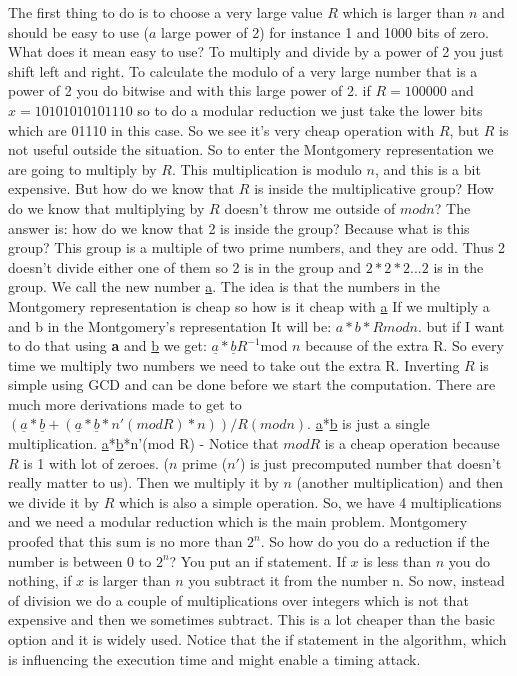 The first thing to do is to choose a very large value $R$ which is larger than
$n$ and should be easy to use ($a$ large power of 2) for instance 1 and 1000
bits of zero. What does it mean easy to use? To multiply and divide by a power
of 2 you just shift left and right. To calculate the modulo of a very large number
that is a power of 2 you do bitwise and with this large power of 2. if
$R=100000$ and $x = 10101010101110$ so to do a modular reduction we just take the
lower bits which are 01110 in this case. So we see it's very cheap operation with
$R$, but $R$ is not useful outside the situation. So to enter the Montgomery
representation we are going to multiply by $R$. This multiplication is modulo
$n$, and this is a bit expensive. But how do we know that $R$ is
inside the multiplicative group? How do we know that multiplying by $R$ doesn't
throw me outside of $mod n$? The answer is: how do we know that 2 is inside the
group? Because what is this group? This group is a multiple of two prime
numbers, and they are odd. Thus 2 doesn't divide either one of them so 2 is in
the group and \(2*2*2...2\) is in the group. We call the new number
\underline{a}. The idea is that the numbers in the Montgomery representation is
cheap so how is it cheap with \underline{a} If we multiply a and b in the
Montgomery's representation It will be: \(a*b*R mod n\). but if I want to do
that using \textbf{a} and \underline{b} we get:
\(\underline{a}*\underline{b}R^{-1}\)mod $n$ because of the extra R. So every
time we multiply two numbers we need to take out the extra R. Inverting $R$ is
simple using GCD and can be done before we start the computation. There are much
more derivations made to get to  \((\underline{a}*\underline{b} +
(\underline{a}*\underline{b}*n'(mod R)*n))/R(modn) \).
\underline{a}*\underline{b} is just a single multiplication.
\underline{a}*\underline{b}*n'(mod R) - Notice that \(modR\) is a cheap
operation because $R$ is 1 with lot of zeroes. ($n$ prime ($n'$) is just precomputed
number that doesn't really matter to us). 
Then we multiply it by $n$ (another multiplication) and then we divide it by $R$ 
which is also a simple operation. So,
we have 4 multiplications and we need a modular reduction which is the main
problem. Montgomery proofed that this sum is no more than \(2^n\). So how do you
do a reduction if the number is between 0 to \(2^n\)? You put an if statement.
If $x$ is less than $n$ you do nothing, if $x$ is larger than $n$ you subtract it
from the number n. So now, instead of division we do a couple of multiplications
over integers which is not that expensive and then we sometimes subtract. This
is a lot cheaper than the basic option and it is widely used. Notice that the if
statement in the algorithm, which is influencing the execution time and might 
enable a timing attack.

